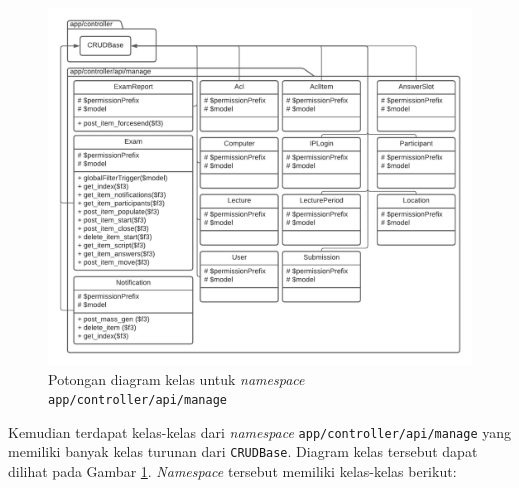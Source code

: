     \begin{figure}
        \centering
        \includegraphics{Gambar/classmap-be/Classmap - app-controller-api-manage.pdf}
        \caption{Potongan diagram kelas untuk \textit{namespace}
        \texttt{app/controller/api/manage}}
        \label{fig:classmap_app-controller-api-manage}
    \end{figure}
    Kemudian terdapat kelas-kelas dari \textit{namespace} \texttt{app/controller/api/manage}
    yang memiliki banyak kelas turunan dari \texttt{CRUDBase}. Diagram kelas tersebut dapat
    dilihat pada Gambar \ref{fig:classmap_app-controller-api-manage}. \textit{Namespace}
    tersebut memiliki kelas-kelas berikut:
